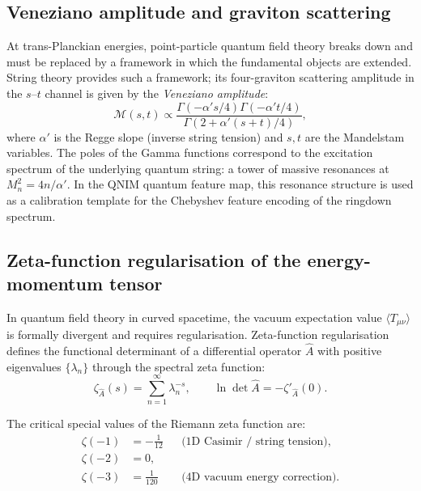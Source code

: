 \documentclass[11pt,a4paper, english]{book}
\theoremstyle{plain}
\theoremstyle{definition}
\numberwithin{equation}{chapter}
\numberwithin{figure}{chapter}
\numberwithin{table}{chapter}
\begin{document}
\subsection{Veneziano amplitude and graviton scattering}
\label{app:subsec:veneziano}

At trans-Planckian energies, point-particle quantum field theory breaks down and must be replaced by a framework in which the fundamental objects are extended. String theory provides such a framework; its four-graviton scattering amplitude in the $s$--$t$ channel is given by the \emph{Veneziano amplitude}:
\begin{equation}
  \label{eq:veneziano}
  \mathcal{M}(s,t) \propto
    \frac{\Gamma\!\left(-\alpha' s/4\right)
          \Gamma\!\left(-\alpha' t/4\right)}
         {\Gamma\!\left(2 + \alpha'(s+t)/4\right)},
\end{equation}
where $\alpha'$ is the Regge slope (inverse string tension) and $s,t$ are the Mandelstam variables. The poles of the Gamma functions correspond to the excitation spectrum of the underlying quantum string: a tower of massive resonances at $M_n^2 = 4n/\alpha'$. In the QNIM quantum feature map, this resonance structure is used as a calibration template for the Chebyshev feature encoding of the ringdown spectrum.

\subsection{Zeta-function regularisation of the energy-momentum tensor}
\label{app:subsec:zeta-regularisation}

In quantum field theory in curved spacetime, the vacuum expectation value $\langle T_{\mu\nu}\rangle$ is formally divergent and requires regularisation. Zeta-function regularisation \cite{Hawking_1975} defines the functional determinant of a differential operator $\hat{A}$ with positive eigenvalues $\{\lambda_n\}$ through the spectral zeta function:
\begin{equation}
  \label{eq:spectral_zeta}
  \zeta_{\hat{A}}(s) = \sum_{n=1}^\infty \lambda_n^{-s},
  \qquad \ln\det\hat{A} = -\zeta'_{\hat{A}}(0).
\end{equation}

The critical special values of the Riemann zeta function are:
\begin{align}
  \label{eq:zeta_values}
  \zeta(-1) &= -\tfrac{1}{12} & &\text{(1D Casimir / string tension),} \\
  \zeta(-2) &= 0,             & &                                        \\
  \zeta(-3) &= \tfrac{1}{120} & &\text{(4D vacuum energy correction).}
\end{align}
\end{document}
